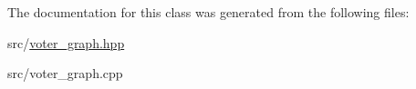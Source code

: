 The documentation for this class was generated from the following files\-:\begin{DoxyCompactItemize}
\item 
src/\hyperlink{voter__graph_8hpp}{voter\-\_\-graph.\-hpp}\item 
src/voter\-\_\-graph.\-cpp\end{DoxyCompactItemize}
